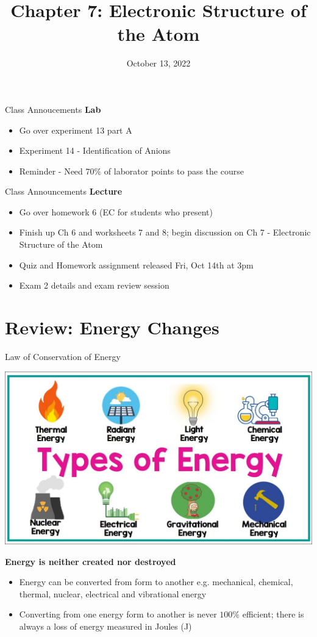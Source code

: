 \documentclass[11pt]{beamer}
\title{Chapter 7: Electronic Structure of the Atom}
\institute{Chemistry Department, Cypress College}
\date{October 13, 2022}
\begin{document}
\begin{frame}
  \titlepage
\end{frame}

\begin{frame}{Class Annoucements}
  \textbf{Lab}
  \begin{itemize}
  \item Go over experiment 13 part A
  \item Experiment 14 - Identification of Anions
  \item Reminder - Need $70\%$ of laborator points to pass the course
  \end{itemize}
\end{frame}

\begin{frame}{Class Announcements}
  \textbf{Lecture}
  \begin{itemize}
  \item Go over homework 6 (EC for students who present)
  \item Finish up Ch 6 and worksheets 7 and 8; begin discussion on Ch 7
    - Electronic Structure of the Atom
  \item Quiz and Homework assignment released Fri, Oct 14th at 3pm
  \item Exam 2 details and exam review session
  \end{itemize}
\end{frame}

\section{Review: Energy Changes}

\begin{frame}{Law of Conservation of Energy}
  \begin{center}
    \includegraphics[scale=0.13]{energy_types}
    
    \textbf{Energy is neither created nor destroyed}
  \end{center}

  \begin{itemize}
  \item Energy can be converted from form to another
    e.g. mechanical, chemical, thermal, nuclear,
    electrical and vibrational energy
  \item Converting from one energy form to another is
    never $100\%$ efficient; there is always a loss of
    energy measured in Joules (J)
  \end{itemize}
\end{frame}
\end{document}
